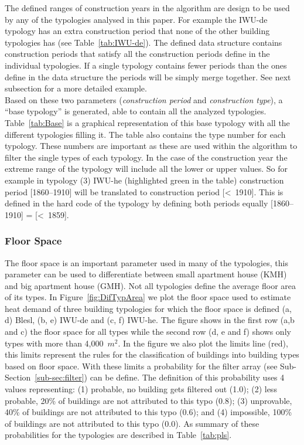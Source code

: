 \documentclass[authoryear,preprint,review,12pt]{elsarticle}
\begin{document}
\begin{linenumbers}
The defined ranges of construction years in the algorithm are design to be used
by any of the typologies analysed in this paper.  For example the IWU-de
typology has an extra construction period that none of the other building
typologies has (see Table~\ref{tab:IWU-de}). The defined data structure
contains construction periods that satisfy all the construction periods define
in the individual typologies. If a single typology contains fewer periods than
the ones define in the data structure the periods will be simply merge
together. See next subsection for a more detailed example.\\

Based on these two parameters (\textit{construction period} and
\textit{construction type}), a ``base typology'' is generated, able to contain
all the analyzed typologies. Table~\ref{tab:Base} is a graphical
representation of this base typology with all the different typologies filling
it. The table also contains the type number for each typology. These numbers
are important as these are used within the algorithm to filter the single types
of each typology. In the case of the construction year the extreme range of
the typology will include all the lower or upper values.  So for example in
typology (3) IWU-he (highlighted green in the table) construction period
[1860--1910] will be translated to construction period [\textless~1910]. This
is defined in the hard code of the typology by defining both periods equally
[1860--1910] = [\textless~1859].\\



\subsubsection{Floor Space}\label{sub-sec:livings}

The floor space is an important parameter used in many of the typologies, this
parameter can be used to differentiate between small apartment house (KMH) and
big apartment house (GMH).  Not all typologies define the average floor area of
its types.  In Figure~\ref{fig:DifTypArea} we plot the floor space used to
estimate heat demand of three building typologies for which the floor space is
defined (a, d) Blesl, (b, e) IWU-de and (c, f) IWU-he.  The figure shows in the
first row (a,b and c) the floor space for all types while the second row (d, e
and f) shows only types with more than 4,000~$m^2$. In the figure we also plot
the limits line (red), this limits represent the rules for the classification
of buildings into building types based on floor space. With these limits a
probability for the filter array (see Sub-Section~\ref{sub-sec:filter}) can be
define.  The definition of this probability uses 4 values representing: (1)
probable, no building gets filtered out (1.0); (2) less probable, 20\% of
buildings are not attributed to this typo (0.8); (3) unprovable, 40\% of
buildings are not attributed to this typo (0.6); and (4) impossible, 100\% of
buildings are not attributed to this typo (0.0).  As summary of these
probabilities for the typologies are described in Table~\ref{tab:pls}.\\


\end{linenumbers}
\end{document}
